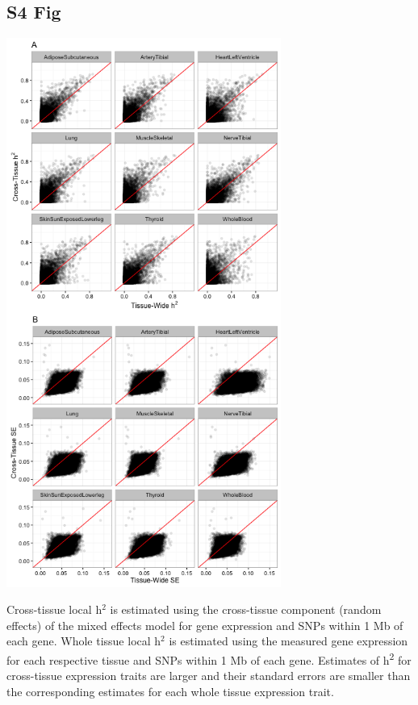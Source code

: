 \documentclass[10pt,letterpaper]{article}
\begin{document}
\begin{singlespace}
\subsection*{S4 Fig}
\includegraphics[width=9cm]{Figures/GenArch_Supp/S3Fig.png}
\label{S4_Fig}

 Cross-tissue local h$^2$ is estimated using the cross-tissue component (random effects) of the mixed effects model for gene expression and SNPs within 1 Mb of each gene. Whole tissue local h$^2$ is estimated using the measured gene expression for each respective tissue and SNPs within 1 Mb of each gene. Estimates of h\textsuperscript{2} for cross-tissue expression traits are larger and their standard errors are smaller than the corresponding estimates for each whole tissue expression trait.


\end{singlespace}
\end{document}
